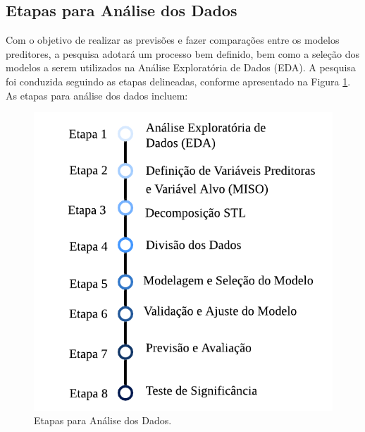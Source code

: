 \subsection{Etapas para An\'alise dos Dados} 
\label{subsec:metod}

Com o objetivo de realizar as previsões e fazer comparações entre os modelos preditores, a pesquisa adotará um processo bem definido, bem como a seleção dos modelos a serem utilizados na Análise Exploratória de Dados (EDA). A pesquisa foi conduzida seguindo as etapas delineadas, conforme apresentado na Figura \ref{fig:etapas}.
As etapas para análise dos dados incluem:

\begin{figure}[!htb]
	\centering
	\caption{Etapas para Análise dos Dados.}
	\label{fig:etapas}
	\includegraphics[width=0.7\linewidth]{Introducao/Figuras/Etapas.pdf}
\end{figure}

